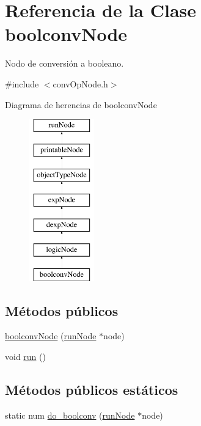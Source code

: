 \hypertarget{classboolconvNode}{\section{Referencia de la Clase boolconv\-Node}
\label{classboolconvNode}
}


Nodo de conversión a booleano.  




{\ttfamily \#include $<$conv\-Op\-Node.\-h$>$}

Diagrama de herencias de boolconv\-Node\begin{figure}[H]
\begin{center}
\leavevmode
\includegraphics[height=7.000000cm]{classboolconvNode}
\end{center}
\end{figure}
\subsection*{Métodos públicos}
\begin{DoxyCompactItemize}
\item 
\hyperlink{classboolconvNode_a5e675df17489517475859bc393f232ce}{boolconv\-Node} (\hyperlink{classrunNode}{run\-Node} $\ast$node)
\item 
void \hyperlink{classboolconvNode_a344001e8903f5969a0187021d749c637}{run} ()
\end{DoxyCompactItemize}
\subsection*{Métodos públicos estáticos}
\begin{DoxyCompactItemize}
\item 
static num \hyperlink{classboolconvNode_a7bb697f6a097e580cb5fbfb1c0b6391a}{do\-\_\-boolconv} (\hyperlink{classrunNode}{run\-Node} $\ast$node)
\end{DoxyCompactItemize}
